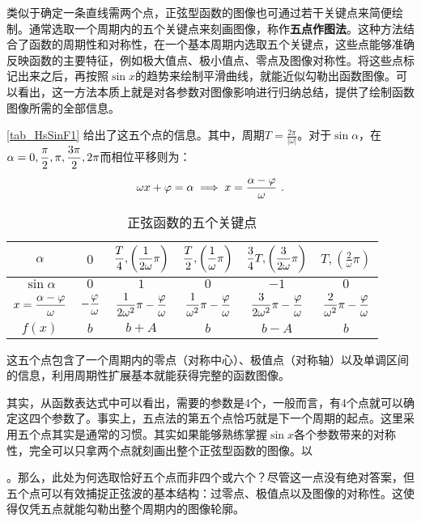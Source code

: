 类似于确定一条直线需两个点，正弦型函数的图像也可通过若干关键点来简便绘制。通常选取一个周期内的五个关键点来刻画图像，称作\textbf{五点作图法}。这种方法结合了函数的周期性和对称性，在一个基本周期内选取五个关键点，这些点能够准确反映函数的主要特征，例如极大值点、极小值点、零点及图像对称性。将这些点标记出来之后，再按照$\sin x$的趋势来绘制平滑曲线，就能近似勾勒出函数图像。可以看出，这一方法本质上就是对各参数对图像影响进行归纳总结，提供了绘制函数图像所需的全部信息。

\autoref{tab_HsSinF1} 给出了这五个点的信息。其中，周期$\displaystyle T = \frac{2\pi}{|\omega|}$。对于$\sin\alpha$，在$\displaystyle\alpha=0,{\pi\over2},\pi,{3\pi\over2},2\pi$而相位平移则为：
\begin{equation}
\omega x + \varphi=\alpha\implies x={\alpha-\varphi\over \omega}~.
\end{equation}

\begin{table}[ht]
\centering
\caption{正弦函数的五个关键点}\label{tab_HsSinF1}
\begin{tabular}{|c|c|c|c|c|c|}
\hline
$\alpha$ & $0$ &$\displaystyle {T\over4},\left(\frac{1}{2\omega}\pi\right)$& $\displaystyle {T\over2},\left(\frac{1}{\omega}\pi\right)$ & $\displaystyle {3\over4}T,\left(\frac{3}{2\omega}\pi\right)$ & $\displaystyle T,\left(\frac{2}{\omega}\pi\right)$\\
\hline
$\sin \alpha$ & $0$&$1$&$0$&$-1$&$0$ \\
\hline
$x=\displaystyle{\alpha-\varphi\over \omega}$&$\displaystyle-{\varphi\over \omega}$&$\displaystyle{1\over 2\omega^2}\pi-{\varphi\over \omega}$&$\displaystyle{1\over \omega^2}\pi-{\varphi\over \omega}$&$\displaystyle{3\over 2\omega^2}\pi-{\varphi\over \omega}$&$\displaystyle{2\over \omega^2}\pi-{\varphi\over \omega}$\\
\hline
$f(x)$ & $b$&$b+A$&$b$&$b-A$&$b$ \\
\hline
\end{tabular}
\end{table}
这五个点包含了一个周期内的零点（对称中心）、极值点（对称轴）以及单调区间的信息，利用周期性扩展基本就能获得完整的函数图像。


其实，从函数表达式中可以看出，需要的参数是4个，一般而言，有4个点就可以确定这四个参数了。事实上，五点法的第五个点恰巧就是下一个周期的起点。这里采用五个点其实是通常的习惯。其实如果能够熟练掌握$\sin x$各个参数带来的对称性，完全可以只拿两个点就刻画出整个正弦型函数的图像。以

。那么，此处为何选取恰好五个点而非四个或六个？尽管这一点没有绝对答案，但五个点可以有效捕捉正弦波的基本结构：过零点、极值点以及图像的对称性。这使得仅凭五点就能勾勒出整个周期内的图像轮廓。

